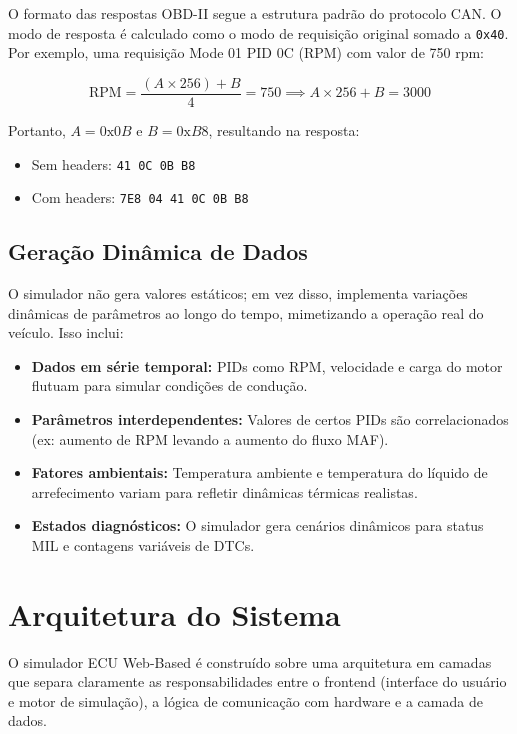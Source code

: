 O formato das respostas OBD-II segue a estrutura padrão do protocolo CAN. O modo de resposta é calculado como o modo de requisição original somado a \texttt{0x40}. Por exemplo, uma requisição Mode 01 PID 0C (RPM) com valor de 750 rpm:

\begin{equation}
\text{RPM} = \frac{(A \times 256) + B}{4} = 750 \implies A \times 256 + B = 3000
\end{equation}

Portanto, $A = 0\text{x}0B$ e $B = 0\text{x}B8$, resultando na resposta:
\begin{itemize}
    \item Sem headers: \texttt{41 0C 0B B8}
    \item Com headers: \texttt{7E8 04 41 0C 0B B8}
\end{itemize}

\subsection{Geração Dinâmica de Dados}

O simulador não gera valores estáticos; em vez disso, implementa variações dinâmicas de parâmetros ao longo do tempo, mimetizando a operação real do veículo. Isso inclui:

\begin{itemize}
    \item \textbf{Dados em série temporal:} PIDs como RPM, velocidade e carga do motor flutuam para simular condições de condução.
    \item \textbf{Parâmetros interdependentes:} Valores de certos PIDs são correlacionados (ex: aumento de RPM levando a aumento do fluxo MAF).
    \item \textbf{Fatores ambientais:} Temperatura ambiente e temperatura do líquido de arrefecimento variam para refletir dinâmicas térmicas realistas.
    \item \textbf{Estados diagnósticos:} O simulador gera cenários dinâmicos para status MIL e contagens variáveis de DTCs.
\end{itemize}

\section{Arquitetura do Sistema}
\label{sec:arquitetura}

O simulador ECU Web-Based é construído sobre uma arquitetura em camadas que separa claramente as responsabilidades entre o frontend (interface do usuário e motor de simulação), a lógica de comunicação com hardware e a camada de dados.

